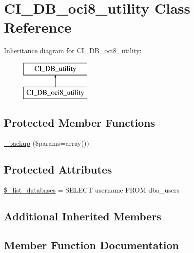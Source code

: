\hypertarget{class_c_i___d_b__oci8__utility}{}\section{C\+I\+\_\+\+D\+B\+\_\+oci8\+\_\+utility Class Reference}
\label{class_c_i___d_b__oci8__utility}
Inheritance diagram for C\+I\+\_\+\+D\+B\+\_\+oci8\+\_\+utility\+:\begin{figure}[H]
\begin{center}
\leavevmode
\includegraphics[height=2.000000cm]{class_c_i___d_b__oci8__utility}
\end{center}
\end{figure}
\subsection*{Protected Member Functions}
\begin{DoxyCompactItemize}
\item 
\mbox{\hyperlink{class_c_i___d_b__oci8__utility_a30f3053d2c82e7562349924363507afa}{\+\_\+backup}} (\$params=array())
\end{DoxyCompactItemize}
\subsection*{Protected Attributes}
\begin{DoxyCompactItemize}
\item 
\mbox{\hyperlink{class_c_i___d_b__oci8__utility_afe3a5b80562d93d6bc7e2b53c95b7e5a}{\$\+\_\+list\+\_\+databases}} = \textquotesingle{}S\+E\+L\+E\+CT username F\+R\+OM dba\+\_\+users\textquotesingle{}
\end{DoxyCompactItemize}
\subsection*{Additional Inherited Members}


\subsection{Member Function Documentation}
\mbox{\label{class_c_i___d_b__oci8__utility_a30f3053d2c82e7562349924363507afa}} 

